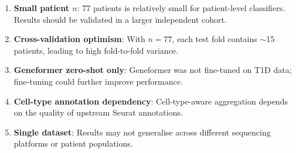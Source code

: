 \begin{enumerate}
    \item \textbf{Small patient $n$}: 77 patients is relatively small for patient-level classifiers. Results should be validated in a larger independent cohort.
    \item \textbf{Cross-validation optimism}: With $n=77$, each test fold contains $\sim$15 patients, leading to high fold-to-fold variance.
    \item \textbf{Geneformer zero-shot only}: Geneformer was not fine-tuned on T1D data; fine-tuning could further improve performance.
    \item \textbf{Cell-type annotation dependency}: Cell-type-aware aggregation depends on the quality of upstream Seurat annotations.
    \item \textbf{Single dataset}: Results may not generalise across different sequencing platforms or patient populations.
\end{enumerate}
